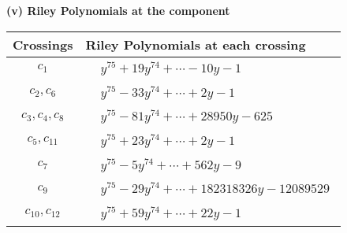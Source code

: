 \documentclass[1p]{elsarticle_modified}
\theoremstyle{definition}
\begin{document}
\newpage\renewcommand{\arraystretch}{1}
\flushleft \textbf{(v) Riley Polynomials at the component}\newline \\
\begin{tabular}{m{50pt}|m{274pt}}
Crossings & \hspace{64pt}Riley Polynomials at each crossing \\
\hline $$\begin{aligned}c_{1}\end{aligned}$$&$\begin{aligned}
&y^{75}+19 y^{74}+\cdots-10 y-1
\end{aligned}$\\
\hline $$\begin{aligned}c_{2},c_{6}\end{aligned}$$&$\begin{aligned}
&y^{75}-33 y^{74}+\cdots+2 y-1
\end{aligned}$\\
\hline $$\begin{aligned}c_{3},c_{4},c_{8}\end{aligned}$$&$\begin{aligned}
&y^{75}-81 y^{74}+\cdots+28950 y-625
\end{aligned}$\\
\hline $$\begin{aligned}c_{5},c_{11}\end{aligned}$$&$\begin{aligned}
&y^{75}+23 y^{74}+\cdots+2 y-1
\end{aligned}$\\
\hline $$\begin{aligned}c_{7}\end{aligned}$$&$\begin{aligned}
&y^{75}-5 y^{74}+\cdots+562 y-9
\end{aligned}$\\
\hline $$\begin{aligned}c_{9}\end{aligned}$$&$\begin{aligned}
&y^{75}-29 y^{74}+\cdots+182318326 y-12089529
\end{aligned}$\\
\hline $$\begin{aligned}c_{10},c_{12}\end{aligned}$$&$\begin{aligned}
&y^{75}+59 y^{74}+\cdots+22 y-1
\end{aligned}$\\
\hline
\end{tabular}\\~\\
\end{document}
